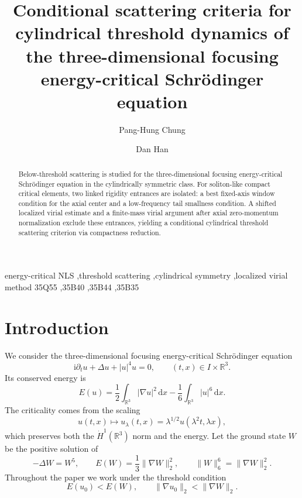 \documentclass[preprint,12pt]{elsarticle}
\numberwithin{equation}{section}
\newcommand{\R}{\mathbb R}
\newcommand{\ii}{\mathrm i}
\newcommand{\dd}{\,\mathrm d}
\newcommand{\na}{\nabla}
\newcommand{\pa}{\partial}
\theoremstyle{remark}
\begin{document}
\begin{frontmatter}

\title{Conditional scattering criteria for cylindrical threshold dynamics of the three-dimensional focusing energy-critical Schr\"odinger equation}

\author[addr1]{Pang-Hung Chung}
\author[addr2]{Dan Han}
\address[addr1]{Department of Applied Mathematics, Guangdong University of Education, Guangzhou 510640, P. R. China}
\address[addr2]{Department of Mathematics, University of Louisville, Louisville, KY 40245, USA}

\begin{abstract}
Below-threshold scattering is studied for the three-dimensional focusing energy-critical Schr\"odinger equation in the cylindrically symmetric class.  For soliton-like compact critical elements, two linked rigidity entrances are isolated: a best fixed-axis window condition for the axial center and a low-frequency tail smallness condition.  A shifted localized virial estimate and a finite-mass virial argument after axial zero-momentum normalization exclude these entrances, yielding a conditional cylindrical threshold scattering criterion via compactness reduction.
\end{abstract}

\begin{keyword}
energy-critical NLS \sep threshold scattering \sep cylindrical symmetry \sep localized virial method
\MSC[2020] 35Q55 \sep 35B40 \sep 35B44 \sep 35B35
\end{keyword}

\end{frontmatter}

\section{Introduction}

We consider the three-dimensional focusing energy-critical Schr\"odinger equation
\begin{equation}\label{eq:nls}
  \ii \pa_t u+\Delta u+|u|^4u=0,
  \qquad (t,x)\in I\times \R^3.
\end{equation}
Its conserved energy is
\[
  E(u)=\frac12\int_{\R^3}|\na u|^2\dd x
       -\frac16\int_{\R^3}|u|^6\dd x.
\]
The criticality comes from the scaling
\[
  u(t,x)\mapsto u_\lambda(t,x)=\lambda^{1/2}u(\lambda^2t,\lambda x),
\]
which preserves both the $\dot H^1(\R^3)$ norm and the energy.  Let the ground state $W$ be the positive solution of
\[
  -\Delta W=W^5,
  \qquad E(W)=\frac13\|\na W\|_2^2,
  \qquad \|W\|_6^6=\|\na W\|_2^2.
\]
Throughout the paper we work under the threshold condition
\begin{equation}\label{eq:threshold}
  E(u_0)<E(W),\qquad \|\na u_0\|_2<\|\na W\|_2.
\end{equation}
\end{document}
